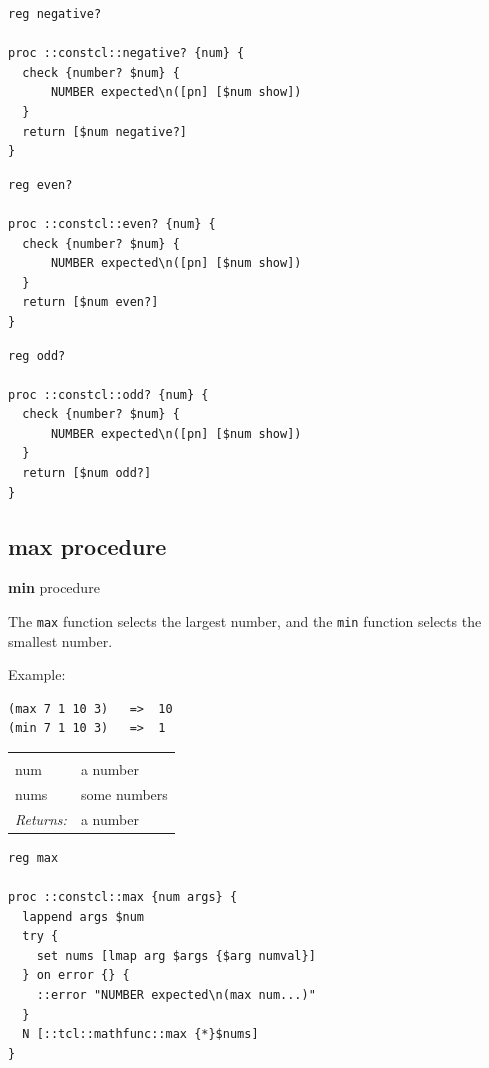 \documentclass[twoside]{report}
\begin{document}
\begin{lstlisting}
reg negative?

proc ::constcl::negative? {num} {
  check {number? $num} {
      NUMBER expected\n([pn] [$num show])
  }
  return [$num negative?]
}
\end{lstlisting}

\begin{lstlisting}
reg even?

proc ::constcl::even? {num} {
  check {number? $num} {
      NUMBER expected\n([pn] [$num show])
  }
  return [$num even?]
}
\end{lstlisting}

\begin{lstlisting}
reg odd?

proc ::constcl::odd? {num} {
  check {number? $num} {
      NUMBER expected\n([pn] [$num show])
  }
  return [$num odd?]
}
\end{lstlisting}

\subsection{max procedure}
\label{max-procedure}

\textbf{min} procedure

The \texttt{max} function selects the largest number, and the \texttt{min} function selects the smallest number.

Example:

\begin{verbatim}
(max 7 1 10 3)   =>  10
(min 7 1 10 3)   =>  1
\end{verbatim}

\noindent\begin{tabular}{ |p{1.9cm} p{8cm}| }
\hline
\rowcolor[HTML]{CCCCCC} \multicolumn{2}{|l|}{\bf max, min (public)} \\
num & a number \\
nums & some numbers \\
\textit{Returns:} & a number \\
\hline
\end{tabular}

\begin{lstlisting}
reg max

proc ::constcl::max {num args} {
  lappend args $num
  try {
    set nums [lmap arg $args {$arg numval}]
  } on error {} {
    ::error "NUMBER expected\n(max num...)"
  }
  N [::tcl::mathfunc::max {*}$nums]
}
\end{lstlisting}
\end{document}
